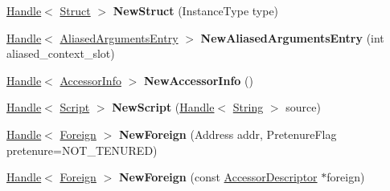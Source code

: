 \begin{DoxyCompactItemize}
\item 
\hyperlink{classv8_1_1internal_1_1_handle}{Handle}$<$ \hyperlink{classv8_1_1internal_1_1_struct}{Struct} $>$ {\bfseries New\+Struct} (Instance\+Type type)\hypertarget{classv8_1_1internal_1_1_factory_ad17cb6fefbf0a7dfe82a848d8e81d759}{}\label{classv8_1_1internal_1_1_factory_ad17cb6fefbf0a7dfe82a848d8e81d759}

\item 
\hyperlink{classv8_1_1internal_1_1_handle}{Handle}$<$ \hyperlink{classv8_1_1internal_1_1_aliased_arguments_entry}{Aliased\+Arguments\+Entry} $>$ {\bfseries New\+Aliased\+Arguments\+Entry} (int aliased\+\_\+context\+\_\+slot)\hypertarget{classv8_1_1internal_1_1_factory_a03d8e5a43a14d06db90b75afccf4667a}{}\label{classv8_1_1internal_1_1_factory_a03d8e5a43a14d06db90b75afccf4667a}

\item 
\hyperlink{classv8_1_1internal_1_1_handle}{Handle}$<$ \hyperlink{classv8_1_1internal_1_1_accessor_info}{Accessor\+Info} $>$ {\bfseries New\+Accessor\+Info} ()\hypertarget{classv8_1_1internal_1_1_factory_afc26e671a6f7bfc31bf002f7398718cc}{}\label{classv8_1_1internal_1_1_factory_afc26e671a6f7bfc31bf002f7398718cc}

\item 
\hyperlink{classv8_1_1internal_1_1_handle}{Handle}$<$ \hyperlink{classv8_1_1internal_1_1_script}{Script} $>$ {\bfseries New\+Script} (\hyperlink{classv8_1_1internal_1_1_handle}{Handle}$<$ \hyperlink{classv8_1_1internal_1_1_string}{String} $>$ source)\hypertarget{classv8_1_1internal_1_1_factory_afee5fad49348c3de37c09c4a3861cdd8}{}\label{classv8_1_1internal_1_1_factory_afee5fad49348c3de37c09c4a3861cdd8}

\item 
\hyperlink{classv8_1_1internal_1_1_handle}{Handle}$<$ \hyperlink{classv8_1_1internal_1_1_foreign}{Foreign} $>$ {\bfseries New\+Foreign} (Address addr, Pretenure\+Flag pretenure=N\+O\+T\+\_\+\+T\+E\+N\+U\+R\+ED)\hypertarget{classv8_1_1internal_1_1_factory_a885ff62ae48cfbc8fec78203f5eea4d3}{}\label{classv8_1_1internal_1_1_factory_a885ff62ae48cfbc8fec78203f5eea4d3}

\item 
\hyperlink{classv8_1_1internal_1_1_handle}{Handle}$<$ \hyperlink{classv8_1_1internal_1_1_foreign}{Foreign} $>$ {\bfseries New\+Foreign} (const \hyperlink{structv8_1_1internal_1_1_accessor_descriptor}{Accessor\+Descriptor} $\ast$foreign)\hypertarget{classv8_1_1internal_1_1_factory_aafc6518963df3fcce8c825cb7cf82038}{}\label{classv8_1_1internal_1_1_factory_aafc6518963df3fcce8c825cb7cf82038}


\end{DoxyCompactItemize}
